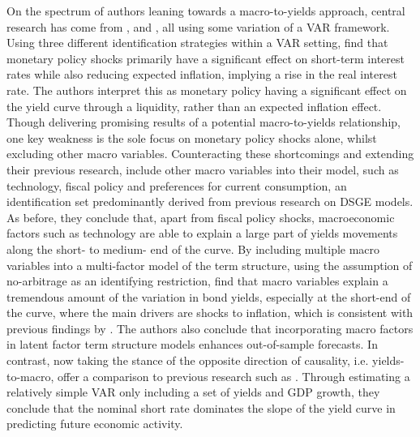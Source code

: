 On the spectrum of authors leaning towards a macro-to-yields approach, central research has come from \citet{evans1998monetary}, \citet{ang2003no} and \citet{evans2007economic}, all using some variation of a VAR framework. 
Using three different identification strategies within a VAR setting, \citet{evans1998monetary} find that monetary policy shocks primarily  have a significant effect on short-term interest rates while also reducing expected inflation, implying a rise in the real interest rate. 
The authors interpret this as monetary policy having a significant effect on the yield curve through a liquidity, rather than an expected inflation effect. 
Though delivering promising results of a potential macro-to-yields relationship, one key weakness is the sole focus on monetary policy shocks alone, whilst excluding other macro variables. 
Counteracting these shortcomings and extending their previous research, \citet{evans2007economic} include other macro variables into their model, such as technology, fiscal policy and preferences for current consumption, an identification set predominantly derived from previous research on DSGE models. As before, they conclude that, apart from fiscal policy shocks, macroeconomic factors such as technology are able to explain a large part of yields movements along the short- to medium- end of the curve. 
By including multiple macro variables into a multi-factor model of the term structure, using the assumption of no-arbitrage as an identifying restriction, \citet{ang2003no} find that macro variables explain a tremendous amount of the variation in bond yields, especially at the short-end of the curve, where the main drivers are shocks to inflation, which is consistent with previous findings by \citet{evans1998monetary}. 
The authors also conclude that incorporating macro factors in latent factor term structure models enhances out-of-sample forecasts. In contrast, now taking the stance of the opposite direction of causality, i.e. yields-to-macro, \citet{ang2006does} offer a comparison to previous research such as \citet{estrella1991term}. 
Through estimating a relatively simple VAR only including a set of yields and GDP growth, they conclude that the nominal short rate dominates the slope of the yield curve in predicting future economic activity. 

